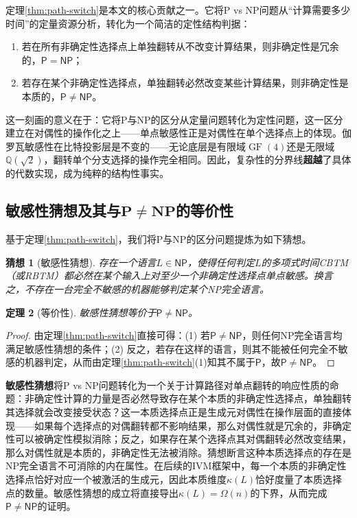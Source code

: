 \documentclass{ctexart}
\newtheorem{theorem}{定理}[section]
\newtheorem{conjecture}[theorem]{猜想}
\newtheorem{proof}[theorem]{证明}
\begin{document}
	定理\ref{thm:path-switch}是本文的核心贡献之一。它将P vs NP问题从``计算需要多少时间''的定量资源分析，转化为一个简洁的定性结构判据：
	\begin{enumerate}
		\item 若在所有非确定性选择点上单独翻转从不改变计算结果，则非确定性是冗余的，$\mathsf{P} = \mathsf{NP}$；
		\item 若存在某个非确定性选择点，单独翻转必然改变某些计算结果，则非确定性是本质的，$\mathsf{P} \neq \mathsf{NP}$。
	\end{enumerate}
	
	这一刻画的意义在于：它将P与NP的区分从定量问题转化为定性问题，这一区分建立在对偶性的操作化之上——单点敏感性正是对偶性在单个选择点上的体现。伽罗瓦敏感性在比特投影层是不变的——无论底层是有限域$\operatorname{GF}(4)$还是无限域$\mathbb{Q}(\sqrt{2})$，翻转单个分支选择的操作完全相同。因此，复杂性的分界线\textbf{超越}了具体的代数实现，成为纯粹的结构性事实。
	
	\subsection{敏感性猜想及其与$\mathbf{P}\neq\mathbf{NP}$的等价性}
	
	基于定理\ref{thm:path-switch}，我们将P与NP的区分问题提炼为如下猜想。
	
	\begin{conjecture}[敏感性猜想]\label{conj:sensitivity}
		存在一个语言$L\in\mathsf{NP}$，使得任何判定$L$的多项式时间CBTM（或RBTM）都必然在某个输入上对至少一个非确定性选择点单点敏感。换言之，不存在一台完全不敏感的机器能够判定某个NP完全语言。
	\end{conjecture}
	
	\begin{theorem}[等价性]\label{thm:sensitivity-equivalence}
		敏感性猜想等价于$\mathsf{P}\neq\mathsf{NP}$。
	\end{theorem}
	\begin{proof}
		由定理\ref{thm:path-switch}直接可得：(1) 若$\mathsf{P}\neq\mathsf{NP}$，则任何NP完全语言均满足敏感性猜想的条件；(2) 反之，若存在这样的语言，则其不能被任何完全不敏感的机器判定，从而由定理\ref{thm:path-switch}(1)知其不属于$\mathsf{P}$，故$\mathsf{P}\neq\mathsf{NP}$。
	\end{proof}
	
	\textbf{敏感性猜想}将P vs NP问题转化为一个关于计算路径对单点翻转的响应性质的命题：非确定性计算的力量是否必然导致存在某个本质的非确定性选择点，单独翻转其选择就会改变接受状态？这一本质选择点正是生成元对偶性在操作层面的直接体现——如果每个选择点的对偶翻转都不影响结果，那么对偶性就是冗余的，非确定性可以被确定性模拟消除；反之，如果存在某个选择点其对偶翻转必然改变结果，那么对偶性就是本质的，非确定性无法被消除。猜想断言这种本质选择点的存在是NP完全语言不可消除的内在属性。在后续的IVM框架中，每一个本质的非确定性选择点恰好对应一个被激活的生成元，因此本质维度$\kappa(L)$恰好度量了本质选择点的数量。敏感性猜想的成立将直接导出$\kappa(L) = \Omega(n)$的下界，从而完成$\mathsf{P} \neq \mathsf{NP}$的证明。
	
\end{document}

